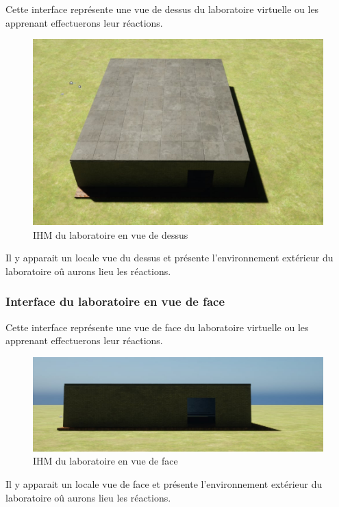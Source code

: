 Cette interface représente une vue de dessus du laboratoire virtuelle ou les apprenant effectuerons leur réactions.

\begin{figure}[H]
	\centering
	\includegraphics[width=1\textwidth]{img/labot}
	\caption{IHM du laboratoire en vue de dessus}
	\label{fig:mesh1}
\end{figure}

Il y apparait un locale vue du dessus et présente l'environnement extérieur du laboratoire oû aurons lieu les réactions.

\subsubsection{Interface du laboratoire en vue de face}

Cette interface représente une vue de face du laboratoire virtuelle ou les apprenant effectuerons leur réactions.

\begin{figure}[H]
	\centering
	\includegraphics[width=1\textwidth]{img/labof}
	\caption{IHM du laboratoire en vue de face}
	\label{fig:mesh1}
\end{figure}

Il y apparait un locale vue de face et présente l'environnement extérieur du laboratoire oû aurons lieu les réactions.

